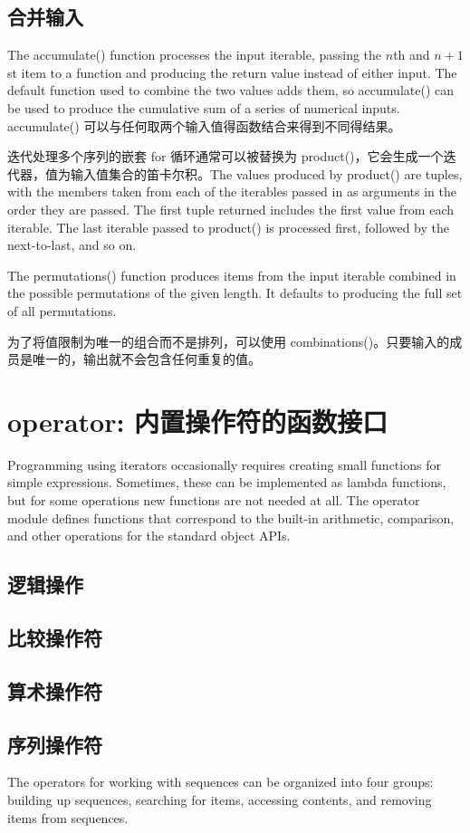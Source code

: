 \subsection{合并输入}
The accumulate() function processes the input iterable, passing the $n$th and $n+1$st item to a function and producing the return value instead of either input. The default function used to combine the two values adds them, so accumulate() can be used to produce the cumulative sum of a series of numerical inputs. accumulate() 可以与任何取两个输入值得函数结合来得到不同得结果。

迭代处理多个序列的嵌套 for 循环通常可以被替换为 product()，它会生成一个迭代器，值为输入值集合的笛卡尔积。The values produced by product() are tuples, with the members taken from each of the iterables passed in as arguments in the order they are passed. The first tuple returned includes the first value from each iterable. The last iterable passed to product() is processed first, followed by the next-to-last, and so on.

The permutations() function produces items from the input iterable combined in the possible permutations of the given length. It defaults to producing the full set of all permutations.

为了将值限制为唯一的组合而不是排列，可以使用 combinations()。只要输入的成员是唯一的，输出就不会包含任何重复的值。

\section{operator: 内置操作符的函数接口}
Programming using iterators occasionally requires creating small functions for simple expressions. Sometimes, these can be implemented as lambda functions, but for some operations new functions are not needed at all. The operator module defines functions that correspond to the built-in arithmetic, comparison, and other operations for the standard object APIs.
\subsection{逻辑操作}
\subsection{比较操作符}
\subsection{算术操作符}
\subsection{序列操作符}
The operators for working with sequences can be organized into four groups: building up sequences, searching for items, accessing contents, and removing items from sequences.